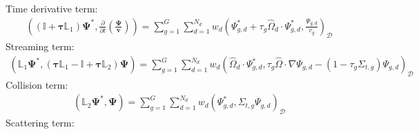 Time derivative term:
%
\begin{gather}
  \left(\left(\mathbb{I}+\bm{\tau}\mathbb{L}_1\right)\bm{\Psi}^*,
  \frac{\partial}{\partial t}\left(\frac{\bm{\Psi}}{\bm{v}}\right)\right) =
  \sum^G_{g=1}\sum^{N_d}_{d=1}w_d\left(\Psi^*_{g,d}+\tau_g\hat{\Omega}_d\cdot\Psi^*_{g,d},
  \frac{\Psi_{g,d}}{v_g}\right)_\mathcal{D}
\end{gather}
%
Streaming term:
%
\begin{gather}
  \left(\mathbb{L}_1\bm{\Psi}^*,
  \left(\bm{\tau}\mathbb{L}_1-\mathbb{I}+\bm{\tau}\mathbb{L}_2\right)\bm{\Psi}\right) =
  \sum^G_{g=1}\sum^{N_d}_{d=1}w_d\left(\hat{\Omega}_d\cdot\Psi^*_{g,d},\tau_g\hat{\Omega}\cdot
  \nabla\Psi_{g,d}-(1-\tau_g\Sigma_{t,g})\Psi_{g,d}\right)_\mathcal{D}
\end{gather}
%
Collision term:
%
\begin{gather}
  \left(\mathbb{L}_2\bm{\Psi}^*,\bm{\Psi}\right) =
  \sum^G_{g=1}\sum^{N_d}_{d=1}w_d\left(\Psi^*_{g,d},\Sigma_{t,g}\Psi_{g,d}\right)_\mathcal{D}
\end{gather}
%
Scattering term:
%
